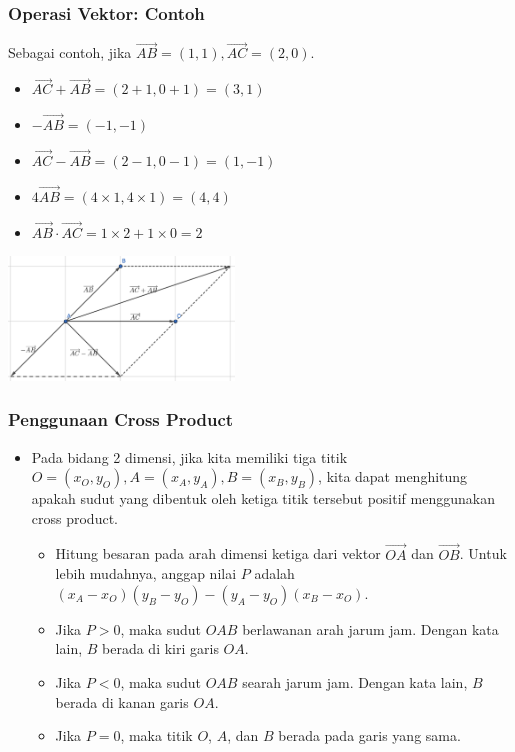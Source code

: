 \begin{frame}
\frametitle{Operasi Vektor: Contoh}
Sebagai contoh, jika $\overrightarrow{AB} = (1, 1), \overrightarrow{AC} = (2, 0)$.
\begin{itemize}
  \item $\overrightarrow{AC} + \overrightarrow{AB} = (2 + 1, 0 + 1) = (3, 1)$
  \item $-\overrightarrow{AB} = (-1, -1)$
  \item $\overrightarrow{AC} - \overrightarrow{AB} = (2 - 1, 0 - 1) = (1, -1)$
  \item $4\overrightarrow{AB} = (4 \times 1, 4 \times 1) = (4, 4)$
  \item $\overrightarrow{AB} \cdot \overrightarrow{AC} = 1 \times 2 + 1 \times 0 = 2$
\end{itemize}
\begin{center}
  \includegraphics[width=6cm]{asset/vector-operations.png}
\end{center}
\end{frame}

\begin{frame}
\frametitle{Penggunaan Cross Product}
\begin{itemize}
  \item Pada bidang 2 dimensi, jika kita memiliki tiga titik $O = (x_O, y_O), A = (x_A, y_A), B = (x_B, y_B)$, kita dapat menghitung apakah sudut yang dibentuk oleh ketiga titik tersebut positif menggunakan cross product.
  \begin{itemize}
    \item Hitung besaran pada arah dimensi ketiga dari vektor $\overrightarrow{OA}$ dan $\overrightarrow{OB}$. Untuk lebih mudahnya, anggap nilai $P$ adalah $(x_A - x_O)(y_B - y_O) - (y_A - y_O)(x_B - x_O)$.
    \item Jika $P > 0$, maka sudut $OAB$ berlawanan arah jarum jam. Dengan kata lain, $B$ berada di kiri garis $OA$.
    \item Jika $P < 0$, maka sudut $OAB$ searah jarum jam. Dengan kata lain, $B$ berada di kanan garis $OA$.
    \item Jika $P = 0$, maka titik $O$, $A$, dan $B$ berada pada garis yang sama. 
  \end{itemize}
\end{itemize}
\end{frame}

